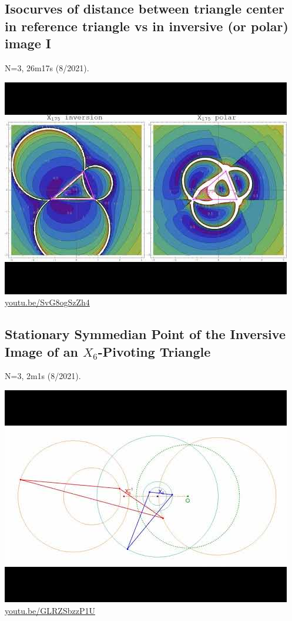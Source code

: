 \documentclass[12pt]{amsart}
\begin{document}
\subsection{Isocurves of distance between triangle center in reference triangle vs in inversive (or polar) image I}
\label{vid:SvG8ogSzZh4}
\noindent N=3, 26m17s (8/2021). 
\begin{center}\includegraphics[width=.5\textwidth]{pics/SvG8ogSzZh4.jpg} \\ 
\href{https://youtu.be/SvG8ogSzZh4}{\url{youtu.be/SvG8ogSzZh4}}\end{center}
% 
\subsection{Stationary Symmedian Point of the Inversive Image of an $X_{6}$-Pivoting Triangle}
\label{vid:GLRZSbzzP1U}
\noindent N=3, 2m1s (8/2021). 
\begin{center}\includegraphics[width=.5\textwidth]{pics/GLRZSbzzP1U.jpg} \\ 
\href{https://youtu.be/GLRZSbzzP1U}{\url{youtu.be/GLRZSbzzP1U}}\end{center}
% 
\end{document}
